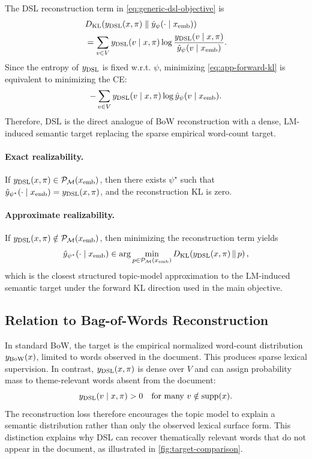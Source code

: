 \documentclass{article}
\theoremstyle{plain}
\theoremstyle{definition}
\theoremstyle{remark}
\begin{document}
The DSL reconstruction term in \autoref{eq:generic-dsl-objective} is
\begin{align}
&D_{\mathrm{KL}}\!\left(
y_{\rm DSL}(x,\pi)
\;\middle\|\;
\hat{y}_{\psi}(\cdot\mid x_{\rm emb})
\right) \\
&=
\sum_{v\in V}
y_{\rm DSL}(v\mid x,\pi)
\log
\frac{y_{\rm DSL}(v\mid x,\pi)}
{\hat{y}_{\psi}(v\mid x_{\rm emb})}.
\label{eq:app-forward-kl}
\end{align}
Since the entropy of $y_{\rm DSL}$ is fixed w.r.t. $\psi$, minimizing \autoref{eq:app-forward-kl} is equivalent to minimizing the CE:
\begin{equation}
-\sum_{v\in V}
y_{\rm DSL}(v\mid x,\pi)
\log \hat{y}_{\psi}(v\mid x_{\rm emb}).
\label{eq:app-dense-ce}
\end{equation}
Therefore, DSL is the direct analogue of BoW reconstruction with a dense, LM-induced semantic target replacing the sparse empirical word-count target.

\paragraph{Exact realizability.}
If $y_{\rm DSL}(x,\pi)\in\mathcal{P}_{\mathcal{M}}(x_{\rm emb})$, then there exists $\psi^\star$ such that
$\hat{y}_{\psi^\star}(\cdot\mid x_{\rm emb})=y_{\rm DSL}(x,\pi)$, and the reconstruction KL is zero.

\paragraph{Approximate realizability.}
If $y_{\rm DSL}(x,\pi)\notin\mathcal{P}_{\mathcal{M}}(x_{\rm emb})$, then minimizing the reconstruction term yields
\begin{equation}
\hat{y}_{\psi^\star}(\cdot\mid x_{\rm emb})
\in
\arg\min_{p\in\mathcal{P}_{\mathcal{M}}(x_{\rm emb})}
D_{\mathrm{KL}}\!\left(y_{\rm DSL}(x,\pi)\,\|\,p\right),
\label{eq:app-forward-kl-projection}
\end{equation}
which is the closest structured topic-model approximation to the LM-induced semantic target under the forward KL direction used in the main objective.

\subsection{Relation to Bag-of-Words Reconstruction}

In standard BoW, the target is the empirical normalized word-count distribution $y_{\rm BoW}(x)$, limited to words observed in the document.
This produces sparse lexical supervision. In contrast, $y_{\rm DSL}(x,\pi)$ is dense over $V$ and can assign probability mass to theme-relevant words absent from the document:
\begin{equation}
y_{\rm DSL}(v\mid x,\pi)>0
\quad\text{for many }v\notin\mathrm{supp}(x).
\end{equation}
The reconstruction loss therefore encourages the topic model to explain a semantic distribution rather than only the observed lexical surface form. This distinction explains why DSL can recover thematically relevant words that do not appear in the document, as illustrated in \autoref{fig:target-comparison}.
\end{document}
